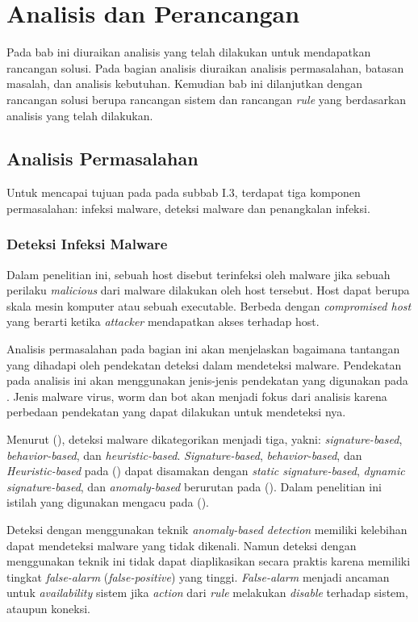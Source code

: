 \chapter{Analisis dan Perancangan}

Pada bab ini diuraikan analisis yang telah dilakukan untuk mendapatkan rancangan solusi. Pada bagian analisis diuraikan analisis permasalahan, batasan masalah, dan analisis kebutuhan. Kemudian bab ini dilanjutkan dengan rancangan solusi berupa rancangan sistem dan rancangan \textit{rule} yang berdasarkan analisis yang telah dilakukan.

\section{Analisis Permasalahan}
Untuk mencapai tujuan pada pada subbab I.3, terdapat tiga komponen permasalahan: infeksi malware, deteksi malware dan penangkalan infeksi.

\subsection{Deteksi Infeksi Malware}

Dalam penelitian ini, sebuah host disebut terinfeksi oleh malware jika sebuah perilaku \textit{malicious} dari malware dilakukan oleh host tersebut. Host dapat berupa skala mesin komputer atau sebuah executable. Berbeda dengan \textit{compromised host} yang berarti ketika \textit{attacker} mendapatkan akses terhadap host. 

Analisis permasalahan pada bagian ini akan menjelaskan bagaimana tantangan yang dihadapi oleh pendekatan deteksi dalam mendeteksi malware. Pendekatan pada analisis ini akan menggunakan jenis-jenis pendekatan yang digunakan pada \cite{idika2007survey}. Jenis malware virus, worm dan bot akan menjadi fokus dari analisis karena perbedaan pendekatan yang dapat dilakukan untuk mendeteksi nya.

Menurut (\cite{6620049}), deteksi malware dikategorikan menjadi tiga, yakni: \textit{signature-based}, \textit{behavior-based}, dan \textit{heuristic-based}. \textit{Signature-based}, \textit{behavior-based}, dan \textit{Heuristic-based} pada (\cite{6620049}) dapat disamakan dengan \textit{static signature-based}, \textit{dynamic signature-based}, dan \textit{anomaly-based} berurutan pada (\cite{idika2007survey}). Dalam penelitian ini istilah yang digunakan mengacu pada (\cite{idika2007survey}).

Deteksi dengan menggunakan teknik \textit{anomaly-based detection} memiliki kelebihan dapat mendeteksi malware yang tidak dikenali. Namun deteksi dengan menggunakan teknik ini tidak dapat diaplikasikan secara praktis karena memiliki tingkat \textit{false-alarm} (\textit{false-positive}) yang tinggi. \textit{False-alarm} menjadi ancaman untuk \textit{availability} sistem jika \textit{action} dari \textit{rule} melakukan \textit{disable} terhadap sistem, ataupun koneksi.

